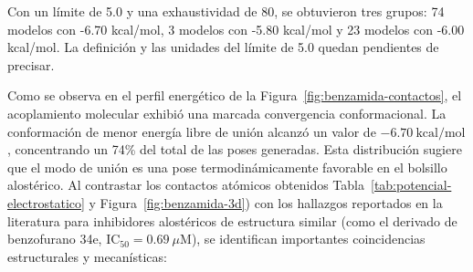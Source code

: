Con un límite de 5.0 y una exhaustividad de 80, se obtuvieron tres grupos: 74 modelos con -6.70 kcal/mol, 3 modelos con -5.80 kcal/mol y 23 modelos con -6.00 kcal/mol. La definición y las unidades del límite de 5.0 quedan pendientes de precisar. 

Como se observa en el perfil energético de la Figura~\ref{fig:benzamida-contactos}, el acoplamiento molecular exhibió una marcada convergencia conformacional. La conformación de menor energía libre de unión alcanzó un valor de $-6.70\ \text{kcal/mol}$, concentrando un 74\% del total de las poses generadas. Esta distribución sugiere que el modo de unión es una pose termodinámicamente favorable en el bolsillo alostérico.
Al contrastar los contactos atómicos obtenidos Tabla~\ref{tab:potencial-electrostatico} y Figura~\ref{fig:benzamida-3d}) con los hallazgos reportados en la literatura para inhibidores alostéricos de estructura similar (como el derivado de benzofurano 34e, $\text{IC}_{50} = 0.69\ \mu\text{M}$), se identifican importantes coincidencias estructurales y mecanísticas:


